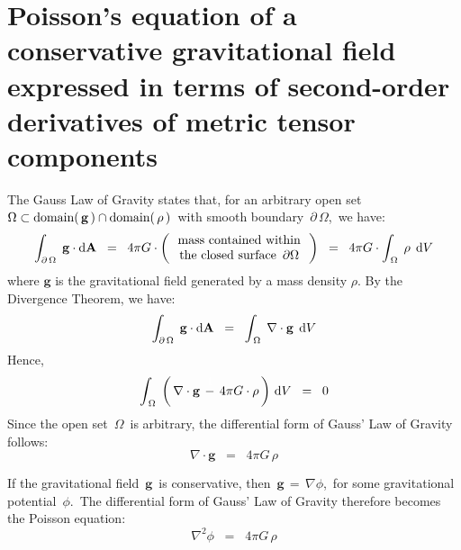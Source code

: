 

\section{Poisson's equation of a conservative gravitational field expressed in terms of second-order derivatives of metric tensor components}
\setcounter{theorem}{0}
\setcounter{equation}{0}


\renewcommand{\theenumi}{\roman{enumi}}
\renewcommand{\labelenumi}{\textnormal{(\theenumi)}$\;\;$}


The Gauss Law of Gravity states that,
for an arbitrary open set
\,$\Omega \subset \textnormal{domain}(\,\mathbf{g}\,) \cap \textnormal{domain}(\,\rho\,)$\,
with smooth boundary \,$\partial\,\Omega$,\,
we have:
\begin{equation*}
\int_{\partial\,\Omega}\;\mathbf{g} \cdot \textnormal{d}\mathbf{A}
\;\; = \;\;
	4 \pi G \cdot
	\left(\,
		\begin{array}{c}
		\textnormal{mass contained within}
		\\
		\textnormal{the closed surface \,$\partial\Omega$}
		\end{array}
		\,\right)
\;\; = \;\;
	4 \pi G \cdot
	\int_{\,\Omega}\; \rho \,\;\textnormal{d} V
\end{equation*}
where $\mathbf{g}$ is the gravitational field generated by a mass density  $\rho$.
By the Divergence Theorem, we have:
\begin{equation*}
\int_{\partial\,\Omega}\;\mathbf{g} \cdot \textnormal{d}\mathbf{A}
\;\; = \;\;
	\int_{\,\Omega}\; \nabla \cdot \mathbf{g} \,\;\textnormal{d} V
\end{equation*}
Hence,
\begin{equation*}
\int_{\,\Omega}\;
	\left(\,
		\nabla \cdot \mathbf{g}
		\, \overset{{\color{white}\textnormal{\small1}}}{-} \,
		4 \pi G \cdot \rho
		\,\right)
	\,\d V
\;\; = \;\;
	0
\end{equation*}
Since the open set \,$\Omega$\, is arbitrary, the differential form of Gauss' Law of Gravity follows:
\begin{equation*}
\nabla \cdot \mathbf{g} \;\; = \;\; 4 \pi G \, \rho
\end{equation*}

\vskip 0.3cm
\noindent
If the gravitational field \,$\mathbf{g}$\, is conservative, then
\,$\mathbf{g} \,=\, \nabla \phi$,\,
for some gravitational potential \,$\phi$.\,
The differential form of Gauss' Law of Gravity therefore becomes the Poisson equation:
\begin{equation}\label{eqnPoisson}
\nabla^{2}\phi \;\; = \;\; 4 \pi G \, \rho
\end{equation}


